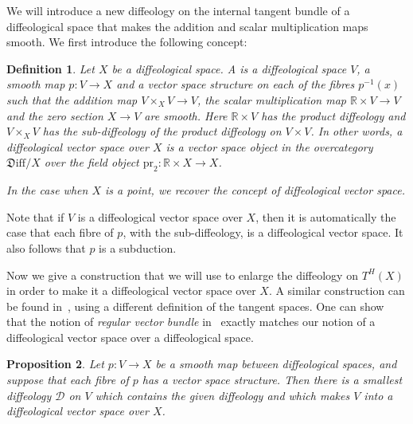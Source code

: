 \documentclass{amsart}
\newcommand{\dfn}[1]{\textbf{\boldmath{#1}}}
\newtheorem{de}{Definition}[section]
\newtheorem{prop}[de]{Proposition}
\theoremstyle{remark}
\newcommand{\ra}{\to}
\newcommand{\Diff}{{\mathfrak{D}\mathrm{iff}}}
\newcommand{\cD}{{\mathcal{D}}}
\newcommand{\pr}{{\mathrm{pr}}}
\def \R{\mathbb{R}}
\begin{document}
We will introduce a new diffeology on the internal tangent bundle of a diffeological space
that makes the addition and scalar multiplication maps smooth.
We first introduce the following concept:

\begin{de}
Let $X$ be a diffeological space.
A \dfn{diffeological vector space over $X$} is a diffeological space $V$,
a smooth map $p : V \to X$
and a vector space structure on each of the
fibres $p^{-1}(x)$ such that the addition map $V \times_X V \to V$,
the scalar multiplication map $\R \times V \to V$
and the zero section $X \ra V$ are smooth.
Here $\R \times V$ has the product diffeology
and $V \times_X V$ has the sub-diffeology of the product diffeology on $V \times V$.
In other words, a diffeological vector space over $X$ is
a vector space object in the overcategory $\Diff/X$
over the field object $\pr_2: \R \times X \to X$.

In the case when $X$ is a point, we recover the concept of diffeological vector space.
\end{de}

Note that if $V$ is a diffeological vector space over $X$, then it
is automatically the case that each fibre of $p$, with the sub-diffeology,
is a diffeological vector space.
It also follows that $p$ is a subduction.

\medskip

Now we give a construction that we will use to enlarge the
diffeology on $T^H(X)$ in order to make it a diffeological
vector space over $X$.
A similar construction can be found in~\cite[Theorem~5.1.6 and Definition~6.2.1]{V},
using a different definition of the tangent spaces.
One can show that the notion of \emph{regular vector bundle} in~\cite{V}
exactly matches our notion of a diffeological vector space over a
diffeological space.
%

\begin{prop}\label{prop:dvs-over-X}
Let $p:V \to X$ be a smooth map between diffeological spaces, and
suppose that each fibre of $p$ has a vector space structure.  Then there
is a smallest diffeology $\cD$ on $V$ which contains the given diffeology
and which makes $V$ into a diffeological vector space over $X$.
\end{prop}
\end{document}
